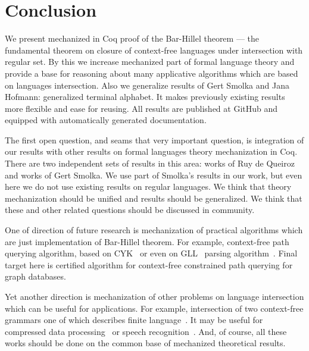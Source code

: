 \section{Conclusion}
\label{sec:conclusion}

We present mechanized in Coq proof of the Bar-Hillel theorem --- the fundamental theorem on closure of context-free languages under intersection with regular set.
By this we increase mechanized part of formal language theory and provide a base for reasoning about many applicative algorithms which are based on languages intersection.
Also we generalize results of Gert Smolka and Jana Hofmann: generalized terminal alphabet. 
It makes previously existing results more flexible and ease for reusing.
All results are published at GitHub and equipped with automatically generated documentation.

The first open question, and seams that very important question, is integration of our results with other results on formal languages theory mechanization in Coq. 
There are two independent sets of results in this area: works of Ruy de Queiroz and works of Gert Smolka.
We use part of Smolka's results in our work, but even here we do not use existing results on regular languages.
We think that theory mechanization should be unified and results should be generalized.
We think that these and other related questions should be discussed in community.

One of direction of future research is mechanization of practical algorithms which are just implementation of Bar-Hillel theorem.
For example, context-free path querying algorithm, based on CYK~\cite{hellingsPathQuerying,zhang2016context} or even on GLL~\cite{scott2010gll} parsing algorithm~\cite{grigorev2016context}.
Final target here is certified algorithm for context-free constrained path querying for graph databases.

Yet another direction is mechanization of other problems on language intersection which can be useful for applications.
For example, intersection of two context-free grammars one of which describes finite language~\cite{nederhof2002parsing, nederhof2004language}.
It may be useful for compressed data processing~\cite{Lohrey2012AlgorithmicsOS} or speech recognition~\cite{Nederhof:2002:PNC:1073083.1073104,NEDERHOF2004172}.
And, of course, all these works should be done on the common base of mechanized theoretical results.



